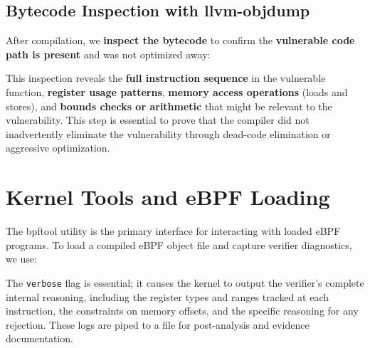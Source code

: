 \subsection{Bytecode Inspection with llvm-objdump}

\noindent
After compilation, we \textbf{inspect the bytecode} to confirm the \textbf{vulnerable code path is present} and was not optimized away:

\vspace{0.3cm}
\noindent
{}
\vspace{0.3cm}

\noindent
This inspection reveals the \textbf{full instruction sequence} in the vulnerable function, \textbf{register usage patterns}, \textbf{memory access operations} (loads and stores), and \textbf{bounds checks or arithmetic} that might be relevant to the vulnerability. This step is essential to prove that the compiler did not inadvertently eliminate the vulnerability through dead-code elimination or aggressive optimization.

\section{Kernel Tools and eBPF Loading}

The bpftool utility is the primary interface for interacting with loaded eBPF programs. To load a compiled eBPF object file and capture verifier diagnostics, we use:

\vspace{0.3cm}
\noindent
{}
\vspace{0.3cm}

\noindent
The \texttt{verbose} flag is essential; it causes the kernel to output the verifier's complete internal reasoning, including the register types and ranges tracked at each instruction, the constraints on memory offsets, and the specific reasoning for any rejection. These logs are piped to a file for post-analysis and evidence documentation.

